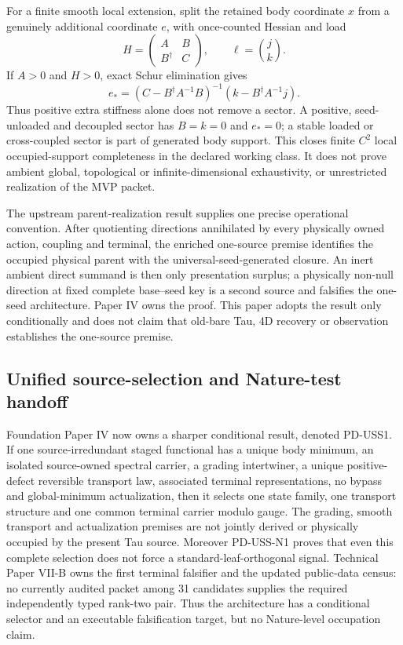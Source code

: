 \documentclass[11pt]{article}
\begin{document}
For a finite smooth local extension, split the retained body coordinate \(x\)
from a genuinely additional coordinate \(e\), with once-counted Hessian and
load
\[
 H=\begin{pmatrix}A&B\\B^\dagger&C\end{pmatrix},
 \qquad \ell=\binom{j}{k}.
\]
If \(A>0\) and \(H>0\), exact Schur elimination gives
\begin{equation}
 e_*=(C-B^\dagger A^{-1}B)^{-1}
      (k-B^\dagger A^{-1}j).
 \label{eq:finite-local-extra-response}
\end{equation}
Thus positive extra stiffness alone does not remove a sector. A positive,
seed-unloaded and decoupled sector has \(B=k=0\) and \(e_*=0\); a stable
loaded or cross-coupled sector is part of generated body support. This closes
finite \(C^2\) local occupied-support completeness in the declared working
class. It does not prove ambient global, topological or infinite-dimensional
exhaustivity, or unrestricted realization of the MVP packet.

The upstream parent-realization result supplies one precise operational
convention. After quotienting directions annihilated by every physically
owned action, coupling and terminal, the enriched one-source premise
identifies the occupied physical parent with the universal-seed-generated
closure. An inert ambient direct summand is then only presentation surplus; a
physically non-null direction at fixed complete base--seed key is a second
source and falsifies the one-seed architecture. Paper IV owns the proof. This
paper adopts the result only conditionally and does not claim that old-bare
Tau, 4D recovery or observation establishes the one-source premise.

\subsection*{Unified source-selection and Nature-test handoff}

Foundation Paper IV now owns a sharper conditional result, denoted
PD-USS1. If one source-irredundant staged functional has a unique body
minimum, an isolated source-owned spectral carrier, a grading intertwiner, a
unique positive-defect reversible transport law, associated terminal
representations, no bypass and global-minimum actualization, then it selects
one state family, one transport structure and one common terminal carrier
modulo gauge. The grading, smooth transport and actualization premises are
not jointly derived or physically occupied by the present Tau source.
Moreover PD-USS-N1 proves that even this complete selection does not force a
standard-leaf-orthogonal signal. Technical Paper VII-B owns the first
terminal falsifier and the updated public-data census: no currently audited
packet among 31 candidates supplies the required independently typed rank-two
pair. Thus the architecture has a conditional selector and an executable
falsification target, but no Nature-level occupation claim.
\end{document}
